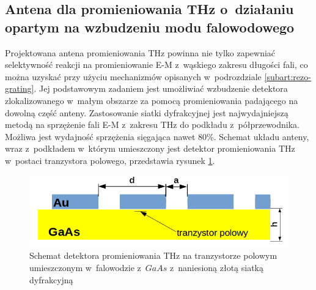 \subsection{Antena dla promieniowania THz o~działaniu opartym na wzbudzeniu modu falowodowego}
\label{subart:antenaThz}
Projektowana antena promieniowania THz powinna nie tylko zapewniać selektywność reakcji na promieniowanie E-M z~wąskiego zakresu długości fali, co można uzyskać przy użyciu mechanizmów opisanych w~podrozdziale \ref{subart:rezo-grating}. Jej podstawowym zadaniem jest umożliwiać wzbudzenie detektora zlokalizowanego w~małym obszarze za pomocą promieniowania padającego na dowolną część anteny. Zastosowanie siatki dyfrakcyjnej jest najwydajniejszą metodą na sprzężenie fali E-M z~zakresu THz do podkładu z~półprzewodnika. Możliwa jest wydajność sprzężenia sięgająca nawet 80\%\cite{roux2002grating}.  Schemat układu anteny, wraz z~podkładem w~którym umieszczony jest detektor promieniowania THz w~postaci tranzystora polowego, przedstawia rysunek \ref{fig:schem-podklad-falo}.
\begin{figure}[tb]
	\centering
	\includegraphics[width=\textwidth]{images/thz/schemat-podklad-falo.png}
	\caption{Schemat detektora promieniowania THz na tranzystorze polowym umieszczonym w~falowodzie z~$GaAs$ z~naniesioną złotą siatką dyfrakcyjną}
	\label{fig:schem-podklad-falo}
\end{figure}

